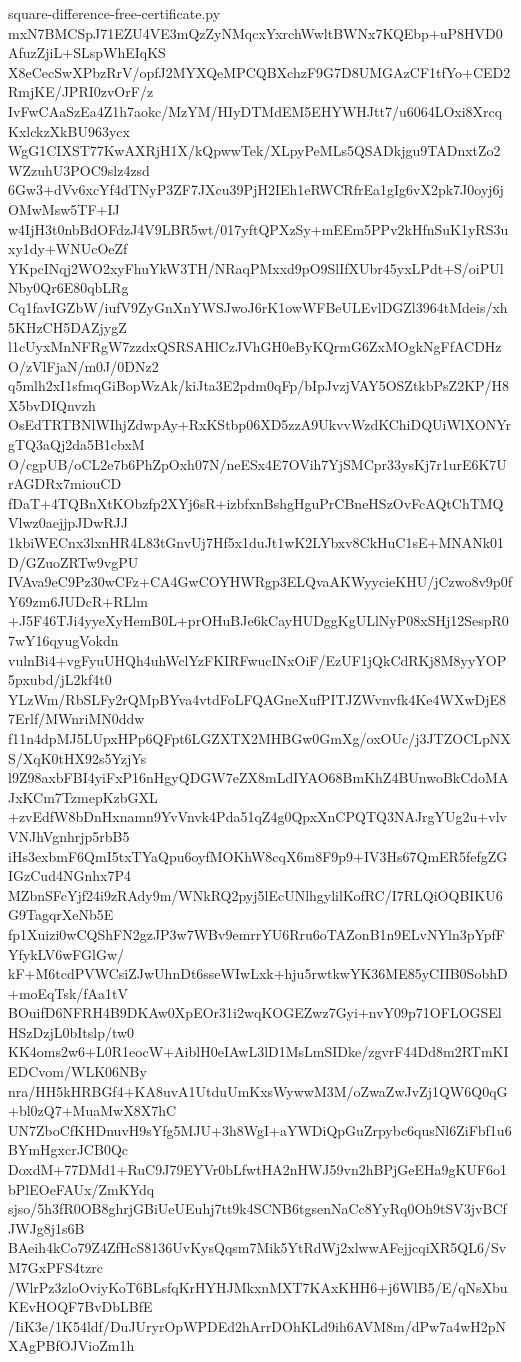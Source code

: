 \documentclass[11pt]{article}
\theoremstyle{definition}
\theoremstyle{remark}
\begin{document}
\begin{filecontents*}[overwrite]{square-difference-free-certificate.py}
mxN7BMCSpJ71EZU4VE3mQzZyNMqcxYxrchWwltBWNx7KQEbp+uP8HVD0AfuzZjiL+SLspWhEIqKS
X8eCecSwXPbzRrV/opfJ2MYXQeMPCQBXchzF9G7D8UMGAzCF1tfYo+CED2RmjKE/JPRI0zvOrF/z
IvFwCAaSzEa4Z1h7aokc/MzYM/HIyDTMdEM5EHYWHJtt7/u6064LOxi8XrcqKxlckzXkBU963ycx
WgG1CIXST77KwAXRjH1X/kQpwwTek/XLpyPeMLs5QSADkjgu9TADnxtZo2WZzuhU3POC9slz4zsd
6Gw3+dVv6xcYf4dTNyP3ZF7JXcu39PjH2IEh1eRWCRfrEa1gIg6vX2pk7J0oyj6jOMwMsw5TF+IJ
w4IjH3t0nbBdOFdzJ4V9LBR5wt/017yftQPXzSy+mEEm5PPv2kHfnSuK1yRS3uxy1dy+WNUcOeZf
YKpcINqj2WO2xyFhuYkW3TH/NRaqPMxxd9pO9SlIfXUbr45yxLPdt+S/oiPUlNby0Qr6E80qbLRg
Cq1favIGZbW/iufV9ZyGnXnYWSJwoJ6rK1owWFBeULEvlDGZl3964tMdeis/xh5KHzCH5DAZjygZ
l1cUyxMnNFRgW7zzdxQSRSAHlCzJVhGH0eByKQrmG6ZxMOgkNgFfACDHzO/zVlFjaN/m0J/0DNz2
q5mlh2xI1sfmqGiBopWzAk/kiJta3E2pdm0qFp/bIpJvzjVAY5OSZtkbPsZ2KP/H8X5bvDIQnvzh
OsEdTRTBNlWIhjZdwpAy+RxKStbp06XD5zzA9UkvvWzdKChiDQUiWlXONYrgTQ3aQj2da5B1cbxM
O/cgpUB/oCL2e7b6PhZpOxh07N/neESx4E7OVih7YjSMCpr33ysKj7r1urE6K7UrAGDRx7miouCD
fDaT+4TQBnXtKObzfp2XYj6sR+izbfxnBshgHguPrCBneHSzOvFcAQtChTMQVlwz0aejjpJDwRJJ
1kbiWECnx3lxnHR4L83tGnvUj7Hf5x1duJt1wK2LYbxv8CkHuC1sE+MNANk01D/GZuoZRTw9vgPU
IVAva9eC9Pz30wCFz+CA4GwCOYHWRgp3ELQvaAKWyycieKHU/jCzwo8v9p0fY69zm6JUDcR+RLlm
+J5F46TJi4yyeXyHemB0L+prOHuBJe6kCayHUDggKgULlNyP08xSHj12SespR07wY16qyugVokdn
vulnBi4+vgFyuUHQh4uhWclYzFKIRFwucINxOiF/EzUF1jQkCdRKj8M8yyYOP5pxubd/jL2kf4t0
YLzWm/RbSLFy2rQMpBYva4vtdFoLFQAGneXufPITJZWvnvfk4Ke4WXwDjE87Erlf/MWnriMN0ddw
f11n4dpMJ5LUpxHPp6QFpt6LGZXTX2MHBGw0GmXg/oxOUc/j3JTZOCLpNXS/XqK0tHX92s5YzjYs
l9Z98axbFBI4yiFxP16nHgyQDGW7eZX8mLdIYAO68BmKhZ4BUnwoBkCdoMAJxKCm7TzmepKzbGXL
+zvEdfW8bDnHxnamn9YvVnvk4Pda51qZ4g0QpxXnCPQTQ3NAJrgYUg2u+vlvVNJhVgnhrjp5rbB5
iHs3exbmF6QmI5txTYaQpu6oyfMOKhW8cqX6m8F9p9+IV3Hs67QmER5fefgZGIGzCud4NGnhx7P4
MZbnSFcYjf24i9zRAdy9m/WNkRQ2pyj5lEcUNlhgylilKofRC/I7RLQiOQBIKU6G9TagqrXeNb5E
fp1Xuizi0wCQShFN2gzJP3w7WBv9emrrYU6Rru6oTAZonB1n9ELvNYln3pYpfFYfykLV6wFGlGw/
kF+M6tcdPVWCsiZJwUhnDt6sseWIwLxk+hju5rwtkwYK36ME85yCIIB0SobhD+moEqTsk/fAa1tV
BOuifD6NFRH4B9DKAw0XpEOr31i2wqKOGEZwz7Gyi+nvY09p71OFLOGSElHSzDzjL0bItslp/tw0
KK4oms2w6+L0R1eocW+AiblH0eIAwL3lD1MsLmSIDke/zgvrF44Dd8m2RTmKIEDCvom/WLK06NBy
nra/HH5kHRBGf4+KA8uvA1UtduUmKxsWywwM3M/oZwaZwJvZj1QW6Q0qG+bl0zQ7+MuaMwX8X7hC
UN7ZboCfKHDnuvH9sYfg5MJU+3h8WgI+aYWDiQpGuZrpybc6qusNl6ZiFbf1u6BYmHgxcrJCB0Qc
DoxdM+77DMd1+RuC9J79EYVr0bLfwtHA2nHWJ59vn2hBPjGeEHa9gKUF6o1bPlEOeFAUx/ZmKYdq
sjso/5h3fR0OB8ghrjGBiUeUEuhj7tt9k4SCNB6tgsenNaCc8YyRq0Oh9tSV3jvBCfJWJg8j1s6B
BAeih4kCo79Z4ZfHcS8136UvKysQqsm7Mik5YtRdWj2xlwwAFejjcqiXR5QL6/SvM7GxPFS4tzrc
/WlrPz3zloOviyKoT6BLsfqKrHYHJMkxnMXT7KAxKHH6+j6WlB5/E/qNsXbuKEvHOQF7BvDbLBfE
/IiK3e/1K54ldf/DuJUryrOpWPDEd2hArrDOhKLd9ih6AVM8m/dPw7a4wH2pNXAgPBfOJVioZm1h

\end{filecontents*}
\end{document}
